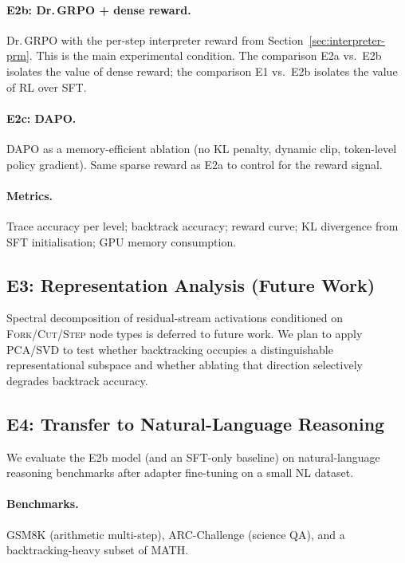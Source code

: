 \paragraph{E2b: Dr.\,GRPO + dense reward.}
Dr.\,GRPO with the per-step interpreter reward from
Section~\ref{sec:interpreter-prm}.
This is the main experimental condition.
The comparison E2a vs.\ E2b isolates the value of dense reward; the comparison
E1 vs.\ E2b isolates the value of RL over SFT.

\paragraph{E2c: DAPO.}
DAPO \citep{yu2025dapo} as a memory-efficient ablation (no KL penalty, dynamic
clip, token-level policy gradient).
Same sparse reward as E2a to control for the reward signal.

\paragraph{Metrics.}
Trace accuracy per level; backtrack accuracy; reward curve; KL divergence from
SFT initialisation; GPU memory consumption.


\subsection{E3: Representation Analysis (Future Work)}
\label{sec:e3}

Spectral decomposition of residual-stream activations conditioned on
\textsc{Fork}/\textsc{Cut}/\textsc{Step} node types is deferred to future work.
We plan to apply PCA/SVD to test whether backtracking occupies a distinguishable
representational subspace and whether ablating that direction selectively
degrades backtrack accuracy.

\subsection{E4: Transfer to Natural-Language Reasoning}
\label{sec:e4}

We evaluate the E2b model (and an SFT-only baseline) on natural-language
reasoning benchmarks after adapter fine-tuning on a small NL dataset.

\paragraph{Benchmarks.}
GSM8K (arithmetic multi-step), ARC-Challenge (science QA), and a
backtracking-heavy subset of MATH.

